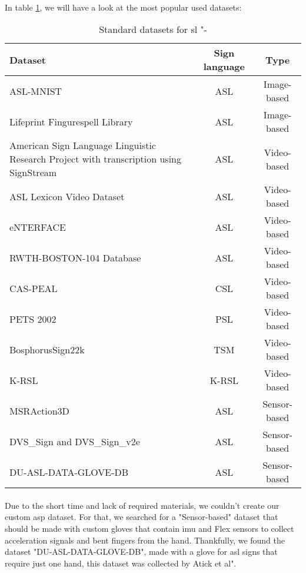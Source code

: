 \paragraph{}
In table \ref{tab:standard-datasets}, we will have a look at the most popular used datasets:
\begin{table}[h]
	\centering
	\caption{Standard datasets for \ac{sl} "\cite{5perc}-\cite{li2011framework}}
	\label{tab:standard-datasets}
	\begin{tabular}{|p{}|c|c|}
		\hline
		Dataset & Sign language & Type \\
		\hline
		ASL-MNIST & ASL & Image-based \\
		\hline
		Lifeprint Fingurespell Library & ASL & Image-based \\
		\hline
		American Sign Language Linguistic Research Project with transcription using SignStream & ASL & Video-based \\
		\hline
		ASL Lexicon Video Dataset & ASL & Video-based \\
		\hline
		eNTERFACE & ASL & Video-based \\
		\hline
		RWTH-BOSTON-104 Database & ASL & Video-based \\
		\hline
		CAS-PEAL & CSL & Video-based \\
		\hline
		PETS 2002 & PSL & Video-based \\
		\hline
		BosphorusSign22k & TSM & Video-based \\
		\hline
		K-RSL & K-RSL & Video-based \\
		\hline
		MSRAction3D & ASL & Sensor-based \\
		\hline
		DVS\_Sign and DVS\_Sign\_v2e & ASL & Sensor-based \\
		\hline
		DU-ASL-DATA-GLOVE-DB & ASL & Sensor-based \\
		\hline
	\end{tabular}
\end{table}
\paragraph{}
Due to the short time and lack of required materials, we couldn't create our custom \ac{asp} dataset. For that, we searched for a "Sensor-based" dataset that should be made with custom gloves that contain \ac{imu} and Flex sensors to collect acceleration signals and bent fingers from the hand. Thankfully, we found the dataset "DU-ASL-DATA-GLOVE-DB", made with a glove for \ac{asl} signs that require just one hand, this dataset was collected by Atick et al"\cite{ref-article}.